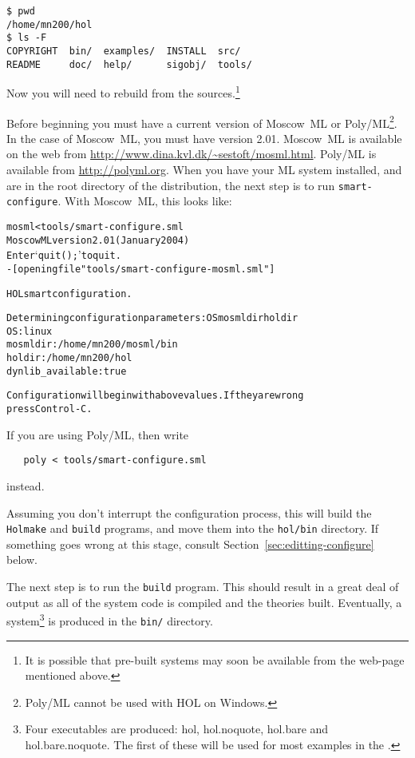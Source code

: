 {\setcounter{sessioncount}{0}
\begin{session}
\begin{verbatim}
$ pwd
/home/mn200/hol
$ ls -F
COPYRIGHT  bin/  examples/  INSTALL  src/
README     doc/  help/      sigobj/  tools/
\end{verbatim}
\end{session}

Now you will need to rebuild \HOL{} from the sources.\footnote{It is
  possible that pre-built systems may soon be available from the
  web-page mentioned above.}

Before beginning you must have a current version of Moscow~ML or
Poly/ML\footnote{Poly/ML cannot be used with HOL on Windows.}.  In the
case of Moscow~ML, you must have version 2.01.  Moscow~ML is available
on the web from \url{http://www.dina.kvl.dk/~sestoft/mosml.html}.
Poly/ML is available from \url{http://polyml.org}. When you have your
ML system installed, and are in the root directory of the
distribution, the next step is to run \texttt{smart-configure}.  With
Moscow~ML, this looks like:

\begin{session}
\begin{alltt}
\dol mosml < tools/smart-configure.sml
Moscow ML version 2.01 (January 2004)
Enter `quit();' to quit.
- [opening file "tools/smart-configure-mosml.sml"]

HOL smart configuration.

Determining configuration parameters: OS mosmldir holdir
OS:                 linux
mosmldir:           /home/mn200/mosml/bin
holdir:             /home/mn200/hol
dynlib_available:   true

Configuration will begin with above values.  If they are wrong
press Control-C.
\end{alltt}
\end{session}

If you are using Poly/ML, then write
\begin{verbatim}
   poly < tools/smart-configure.sml
\end{verbatim}
instead.

Assuming you don't interrupt the configuration process, this will
build the \texttt{Holmake} and \texttt{build} programs, and move them
into the \texttt{hol/bin} directory.  If something goes wrong at this
stage, consult Section~\ref{sec:editting-configure} below.

The next step is to run the \texttt{build} program.  This should
result in a great deal of output as all of the system code is compiled
and the theories built.  Eventually, a \HOL{} system\footnote{Four
  \HOL{} executables are produced: \textsf{hol}, \textsf{hol.noquote},
  \textsf{hol.bare} and \textsf{hol.bare.noquote}.  The first of these
  will be used for most examples in the \TUTORIAL{}.} is produced in
the \texttt{bin/} directory.

}
